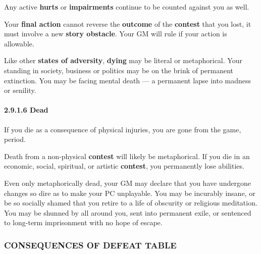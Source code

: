 \documentclass[
]{article}
\begin{document}
Any active \textbf{hurts} or \textbf{impairments} continue to be counted
against you as well.

Your \textbf{final action} cannot reverse the \textbf{outcome} of the
\textbf{contest} that you lost, it must involve a new \textbf{story
obstacle}. Your GM will rule if your action is allowable.

Like other \textbf{states of adversity}, \textbf{dying} may be literal
or metaphorical. Your standing in society, business or politics may be
on the brink of permanent extinction. You may be facing mental death ---
a permanent lapse into madness or senility.

\hypertarget{dead}{%
\paragraph{2.9.1.6 Dead}\label{dead}}

If you die as a consequence of physical injuries, you are gone from the
game, period.

Death from a non-physical \textbf{contest} will likely be metaphorical.
If you die in an economic, social, spiritual, or artistic
\textbf{contest}, you permanently lose abilities.

Even only metaphorically dead, your GM may declare that you have
undergone changes so dire as to make your PC unplayable. You may be
incurably insane, or be so socially shamed that you retire to a life of
obscurity or religious meditation. You may be shunned by all around you,
sent into permanent exile, or sentenced to long-term imprisonment with
no hope of escape.

\hypertarget{consequences-of-defeat-table}{%
\subsubsection{CONSEQUENCES OF DEFEAT
TABLE}\label{consequences-of-defeat-table}}
\end{document}
